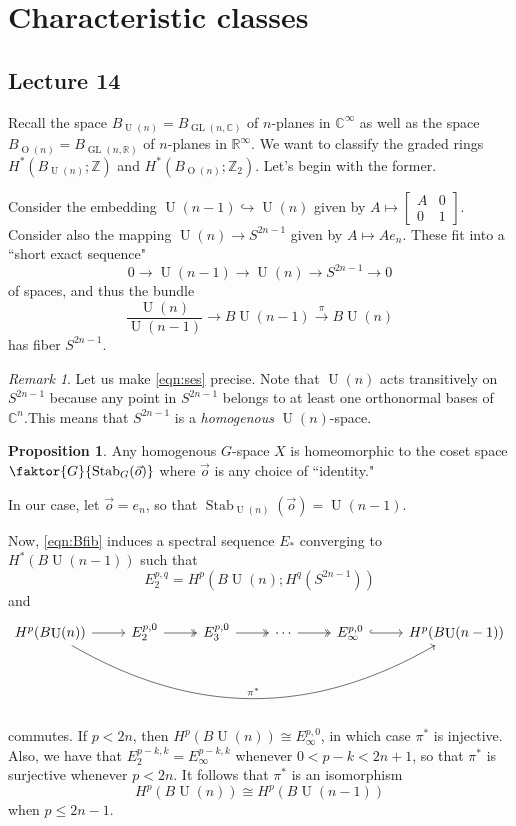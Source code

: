 \documentclass[10pt,letterpaper,cm]{nupset}
\theoremstyle{definition}
\theoremstyle{theorem}
\newtheorem{prop}[defn]{Proposition}
\theoremstyle{remark}
\newtheorem{remark}[defn]{Remark}
\newcommand{\C}{\mathbb C}
\newcommand{\R}{\mathbb{R}}
\newcommand{\Z}{\mathbb Z}
\newcommand{\1}{\mathbb{1}}
\newcommand{\0}{\vec 0}
\DeclareMathOperator{\stab}{Stab}
\DeclareMathOperator{\GL}{GL}
\DeclareMathOperator{\Or}{O}
\DeclareMathOperator{\Un}{U}
\begin{document}
\section{Characteristic classes}

\subsection{Lecture 14}

Recall the space $B_{\Un(n)} = B_{\GL(n, \C)}$ of $n$-planes in $\C^{\infty}$ as well as the space $B_{\Or(n)} = B_{\GL(n, \R)}$ of $n$-planes in $\R^{\infty}$. We want to classify the graded rings 
$H^{\ast}(B_{\Un(n)}; \Z)$ and  
$H^{\ast}(B_{\Or(n)}; \Z_2)$. Let's begin with the former.

\medskip

Consider the embedding $\Un(n-1) \hookrightarrow \Un(n)$ given by $A \mapsto \begin{bmatrix} A & 0 \\ 0 & 1\end{bmatrix}$. Consider also the mapping $\Un(n) \to S^{2n-1}$ given by $A \mapsto A{e_n}$. These fit into a ``short exact sequence"
\[
\label{eqn:ses} 0 \to \Un(n-1)\to \Un(n) \to S^{2n-1} \to 0 \tag{1}
\] of spaces,
and thus the bundle
\[\label{eqn:Bfib}
 \frac{\Un(n)}{\Un(n-1)} \to B{\Un(n-1)} \overset{\pi}{\longrightarrow} B{\Un(n)} \tag{2}
\] has fiber $S^{2n-1}$.

\begin{remark}
Let us make \eqref{eqn:ses} precise. Note that $\Un(n)$ acts transitively on $S^{2n-1}$ because any point in $S^{2n-1}$ belongs to at least one orthonormal bases of $\C^n$.This means that $S^{2n-1}$ is a \textit{homogenous} $\Un(n)$-space. 
\begin{prop}
Any homogenous $G$-space $X$ is homeomorphic to the coset space $\faktor{G}{\stab_G(\vec{o})}$ where $\vec{o}$ is any choice of ``identity." 
\end{prop}
In our case, let $\vec{o} = e_n$, so that $\stab_{\Un(n)}(\vec{o}) = \Un(n-1)$. 
\end{remark}

\medskip

Now, \eqref{eqn:Bfib} induces a spectral sequence $E_{\ast}$ converging to $H^{\ast}(B{\Un(n-1)})$ such that
\[
E_2^{p,q} = H^p(B{\Un(n)}; H^q(S^{2n-1}))
\]
and 
\[
\begin{tikzcd}
H^p(B{\Un(n)}) \arrow[r] \arrow[rrrrr, "\pi^{\ast}", bend right] & {E_2^{p,0}} \arrow[r, two heads] & {E_3^{p,0}} \arrow[r, two heads] & \cdots \arrow[r, two heads] & {E_{\infty}^{p,0}} \arrow[r, hook] & H^p(B{\Un(n-1)})
\end{tikzcd}
\] commutes. If $p< 2n$, then $H^p(B{\Un(n)}) \cong E_{\infty}^{p,0}$, in which case $\pi^{\ast}$ is injective. Also, we have that $E_2^{p-k, k} = E_{\infty}^{p-k, k}$ whenever $0<p-k < 2n+1$, so that $\pi^{\ast}$ is surjective whenever $p<2n$. It follows that $\pi^{\ast}$ is an isomorphism 
\[
\label{eqn:Biso} H^p(B{\Un(n)}) \cong H^p(B{\Un(n-1)}) \tag{3}
\] when $p\leq 2n-1$.
\end{document}
